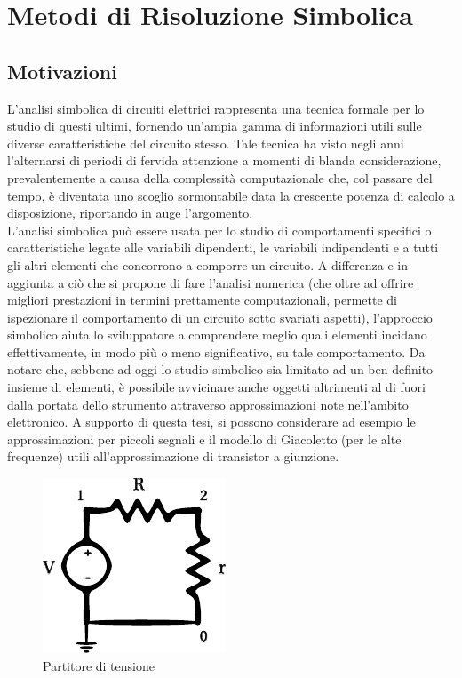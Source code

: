 \chapter{Metodi di Risoluzione Simbolica}

\section{Motivazioni}

L'analisi simbolica di circuiti elettrici rappresenta una tecnica formale per lo studio di questi ultimi, fornendo un'ampia gamma di informazioni utili sulle diverse caratteristiche del circuito stesso. Tale tecnica ha visto negli anni l'alternarsi di periodi di fervida attenzione a momenti di blanda considerazione, prevalentemente a causa della complessità computazionale che, col passare del tempo, è diventata uno scoglio sormontabile data la crescente potenza di calcolo a disposizione, riportando in auge l'argomento.\\
L'analisi simbolica può essere usata per lo studio di comportamenti specifici o caratteristiche legate alle variabili dipendenti, le variabili indipendenti e a tutti gli altri elementi che concorrono a comporre un circuito. A differenza e in aggiunta a ciò che si propone di fare l'analisi numerica (che oltre ad offrire migliori prestazioni in termini prettamente computazionali, permette di ispezionare il comportamento di un circuito sotto svariati aspetti), l'approccio simbolico aiuta lo sviluppatore a comprendere meglio quali elementi incidano effettivamente, in modo più o meno significativo, su tale comportamento. Da notare che, sebbene ad oggi lo studio simbolico sia limitato ad un ben definito insieme di elementi, è possibile avvicinare anche oggetti altrimenti al di fuori dalla portata dello strumento attraverso approssimazioni note nell'ambito elettronico. A supporto di questa tesi, si possono considerare ad esempio le approssimazioni per piccoli segnali e il modello di Giacoletto (per le alte frequenze) utili all'approssimazione di transistor a giunzione.

\begin{figure}[hb]
 \centering
 \includegraphics{immagini/vdiv.pdf}
 \caption{Partitore di tensione}
 \label{fig:vdiv}
\end{figure}

